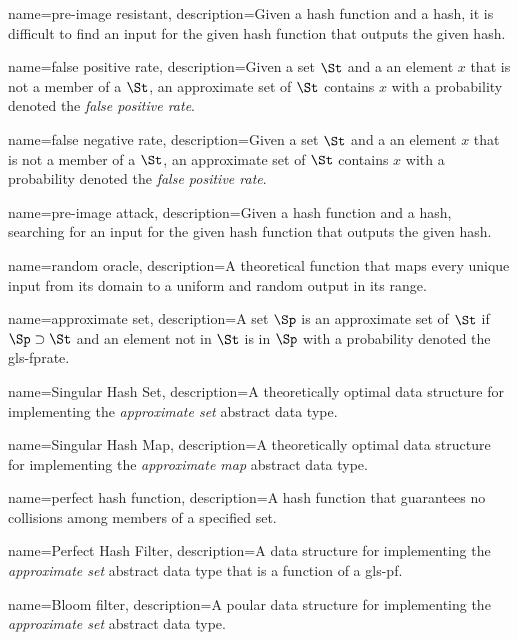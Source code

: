 {
    name={pre-image resistant},
    description={Given a hash function and a hash, it is difficult to find an input for the given hash function that outputs the given hash.}
}

{
    name={false positive rate},
    description={Given a set $\St$ and a an element $x$ that is not a member of a $\St$, an approximate set of $\St$ contains $x$ with a probability denoted the \textit{false positive rate}}.
}

{
    name={false negative rate},
    description={Given a set $\St$ and a an element $x$ that is not a member of a $\St$, an approximate set of $\St$ contains $x$ with a probability denoted the \textit{false positive rate}}.
}

{
    name={pre-image attack},
    description={Given a hash function and a hash, searching for an input for the given hash function that outputs the given hash.}
}

{
    name={random oracle},
    description={A theoretical function that maps every unique input from its domain to a uniform and random output in its range.}
}

{
    name={approximate set},
    description={A set $\Sp$ is an approximate set of $\St$ if $\Sp \supset \St$ and an element not in $\St$ is in $\Sp$ with a probability denoted the \gls*{gls-fprate}.}
}

{
    name={Singular Hash Set},
    description={A theoretically optimal data structure for implementing the \textit{approximate set} abstract data type.}
}

{
    name={Singular Hash Map},
    description={A theoretically optimal data structure for implementing the \textit{approximate map} abstract data type.}
}

{
    name={perfect hash function},
    description={A hash function that guarantees no collisions among members of a specified set.}
}

{
    name={Perfect Hash Filter},
    description={A data structure for implementing the \textit{approximate set} abstract data type that is a function of a \gls*{gls-pf}.}
}

{
    name={Bloom filter},
    description={A poular data structure for implementing the \textit{approximate set} abstract data type.}
}

